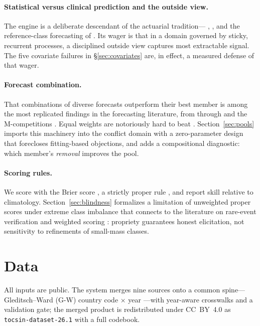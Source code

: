 \documentclass[11pt]{article}
\begin{document}
\paragraph{Statistical versus clinical prediction and the outside view.}
The engine is a deliberate descendant of the actuarial tradition---
\citet{meehl1954clinical}, \citet{dawes1979robust}, and the reference-class
forecasting of \citet{kahneman1993timid}. Its wager is that in a domain
governed by sticky, recurrent processes, a disciplined outside view captures
most extractable signal. The five covariate failures in
\S\ref{sec:covariates} are, in effect, a measured defense of that wager.

\paragraph{Forecast combination.} That combinations of diverse forecasts
outperform their best member is among the most replicated findings in the
forecasting literature, from \citet{bates1969combination} through
\citet{clemen1989combining} and the M-competitions \citep{makridakis2000m3}.
Equal weights are notoriously hard to beat \citep[the ``forecast combination
puzzle'';][]{timmermann2006forecast}. Section~\ref{sec:pools} imports this
machinery into the conflict domain with a zero-parameter design that
forecloses fitting-based objections, and adds a compositional diagnostic:
which member's \emph{removal} improves the pool.

\paragraph{Scoring rules.} We score with the Brier score
\citep{brier1950verification}, a strictly proper rule
\citep{gneiting2007strictly}, and report skill relative to climatology.
Section~\ref{sec:blindness} formalizes a limitation of unweighted proper
scores under extreme class imbalance that connects to the literature on
rare-event verification and weighted scoring \citep{ferro2011extremal}:
propriety guarantees honest elicitation, not sensitivity to refinements of
small-mass classes.

\section{Data}\label{sec:data}

All inputs are public. The system merges nine sources onto a common
spine---Gleditsch--Ward (G-W) country code $\times$ year
\citep{gleditsch1999interstate}---with year-aware crosswalks and a validation
gate; the merged product is redistributed under CC~BY~4.0 as
\texttt{tocsin-dataset-26.1} with a full codebook.
\end{document}
